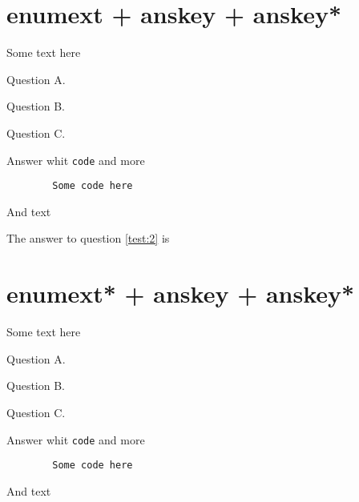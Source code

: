 \documentclass{article}
\begin{document}
\section{enumext + anskey + anskey*}

Some text here

\begin{enumext}[save-ans=test,save-sep={ },save-ref = true]
  \item Question A. 
  \item Question B. 
  \item Question C.
    \begin{anskey*}
    Answer whit \verb+code+ and more
      \begin{verbatim}
        Some code here
      \end{verbatim}
    And text
    \end{anskey*}
\end{enumext}

The answer to question \ref{test:2} is 


\section{enumext* + anskey + anskey*}

Some text here

\begin{enumext*}[save-ans=test-2,save-sep={ },save-ref = true]
  \item Question A. 
  \item Question B. 
  \item Question C.
    \begin{anskey*}
    Answer whit \verb+code+ and more
      \begin{verbatim}
        Some code here
      \end{verbatim}
    And text
    \end{anskey*}
\end{enumext*}

\end{document}
